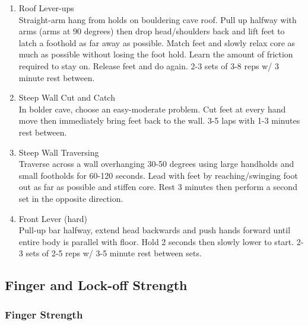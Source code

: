 \documentclass[12pt, letterpaper]{article}
\begin{document}
\begin{enumerate}

    \item Roof Lever-ups \\ 
          Straight-arm hang from holds on bouldering cave roof. Pull up halfway with arms (arms at 90 degrees) then drop head/shoulders
          back and lift feet to latch a foothold as far away as possible. Match feet and slowly relax core as much as possible without
          losing the foot hold. Learn the amount of friction required to stay on. Release feet and do again. 
          2-3 sets of 3-8 reps w/ 3 minute rest between.
    \item Steep Wall Cut and Catch \\ 
          In bolder cave, choose an easy-moderate problem. Cut feet at every hand move then immediately bring feet back to the wall. 
          3-5 laps with 1-3 minutes rest between.
    \item Steep Wall Traversing \\ 
          Traverse across a wall overhanging 30-50 degrees using large handholds and small footholds for 60-120 seconds. 
          Lead with feet by reaching/swinging foot out as far as possible and stiffen core.
          Rest 3 minutes then perform a second set in the opposite direction.
    \item Front Lever (hard) \\ 
          Pull-up bar halfway, extend head backwards and push hands forward until entire body is parallel with floor. 
          Hold 2 seconds then slowly lower to start. 2-3 sets of 2-5 reps  w/ 3-5 minute rest between sets.
    
\end{enumerate}

\subsection{Finger and Lock-off Strength}

\subsubsection{Finger Strength}
\end{document}

